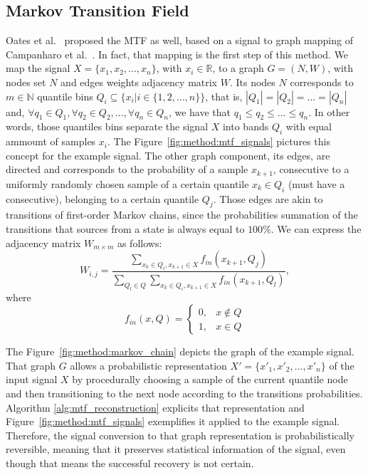 

\subsection{Markov Transition Field}

Oates et al.~\cite{gaf-mtf-1} proposed the \gls{MTF} as well, based on a signal to graph mapping of Campanharo et al.~\cite{mtf-1}. In fact, that mapping is the first step of this method. We map the signal $X=\{x_1,x_2,...,x_n\}$, with $x_i \in \mathbb{R}$, to a graph $G=(N,W)$, with nodes set $N$ and edges weights adjacency matrix $W$. Its nodes $N$ corresponds to $m \in \mathbb{N}$ quantile bins $Q_i \subseteq \{x_i | i \in \{1,2,...,n\}\}$, that is, $|Q_1|=|Q_2|=...=|Q_n|$ and, $\forall q_1 \in Q_1, \forall q_2 \in Q_2, ..., \forall q_n \in Q_n$, we have that $q_1 \leq q_2 \leq ... \leq q_n$. In other words, those quantiles bins separate the signal $X$ into bands $Q_i$ with equal ammount of samples $x_i$. The Figure~\ref{fig:method:mtf_signals} pictures this concept for the example signal. The other graph component, its edges, are directed and corresponds to the probability of a sample $x_{k+1}$, consecutive to a uniformly randomly chosen sample of a certain quantile $x_k \in Q_i$ (must have a consecutive), belonging to a certain quantile $Q_j$. Those edges are akin to transitions of first-order Markov chains, since the probabilities summation of the transitions that sources from a state is always equal to $100\%$. We can express the adjacency matrix $W_{m \times m}$ as follows:  
\begin{equation}
    W_{i,j} = \frac{
            \sum\limits_{x_k \in Q_i, x_{k+1} \in X} f_{in}(x_{k+1}, Q_j)
        }{
            \sum\limits_{Q_l \in Q}\sum\limits_{x_k \in Q_i, x_{k+1} \in X} f_{in}(x_{k+1}, Q_l) 
        },
\end{equation}
where
\begin{equation}
    f_{in}(x,Q) = \begin{cases}
        0, & x \not\in Q \\
        1, & x \in Q
    \end{cases}
\end{equation}






\noindent The Figure~\ref{fig:method:markov_chain} depicts the graph of the example signal. That graph $G$ allows a probabilistic representation $X' = \{ x'_1,x'_2,...,x'_n \}$ of the input signal $X$ by procedurally choosing a sample of the current quantile node and then transitioning to the next node according to the transitions probabilities. Algorithm \ref{alg:mtf_reconstruction} explicits that representation and Figure~\ref{fig:method:mtf_signals} exemplifies it applied to the example signal. Therefore, the signal conversion to that graph representation is probabilistically reversible, meaning that it preserves statistical information of the signal, even though that means the successful recovery is not certain.


